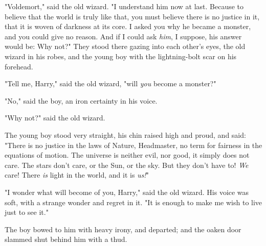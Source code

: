 "Voldemort," said the old wizard. "I understand him now at last. Because to 
believe that the world is truly like that, you must believe there is no justice 
in it, that it is woven of darkness at its core. I asked you why he became a 
monster, and you could give no reason. And if I could ask \emph{him}, I 
suppose, his answer would be: Why not?"
\sbreak
They stood there gazing into each other's eyes, the old wizard in his robes, 
and the young boy with the lightning-bolt scar on his forehead.

"Tell me, Harry," said the old wizard, "will \emph{you} become a monster?"

"No," said the boy, an iron certainty in his voice.

"Why not?" said the old wizard.

The young boy stood very straight, his chin raised high and proud, and said: 
"There is no justice in the laws of Nature, Headmaster, no term for fairness in 
the equations of motion. The universe is neither evil, nor good, it simply does 
not care. The stars don't care, or the Sun, or the sky. But they don't have to! 
\emph{We} care! There \emph{is} light in the world, and it is \emph{us!}"

"I wonder what will become of you, Harry," said the old wizard. His voice was 
soft, with a strange wonder and regret in it. "It is enough to make me wish to 
live just to see it."

The boy bowed to him with heavy irony, and departed; and the oaken door slammed 
shut behind him with a thud.